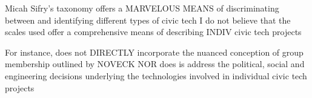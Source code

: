 Micah Sifry’s taxonomy offers a MARVELOUS MEANS of discriminating between and identifying different types of civic tech
I do not believe that the scales used offer a comprehensive means of describing INDIV civic tech projects

For instance, does not DIRECTLY incorporate the nuanced conception of group membership outlined by NOVECK
NOR does is address the political, social and engineering decisions underlying the technologies involved
  in individual civic tech projects